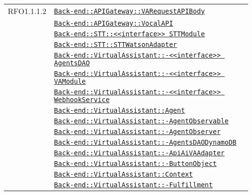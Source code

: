 \begin{longtable}{|>{\centering}m{3cm}|m{10cm}<{\centering}|}
RFO1.1.1.2 & \hyperref[Back-end::APIGateway::VARequestAPIBody]{\texttt{Back-end::APIGateway::VARequestAPIBody}}\\
& \hyperref[Back-end::APIGateway::VocalAPI]{\texttt{Back-end::APIGateway::VocalAPI}}\\
& \hyperref[Back-end::STT::<<interface>> STTModule]{\texttt{Back-end::STT::<<interface>> STTModule}}\\
& \hyperref[Back-end::STT::STTWatsonAdapter]{\texttt{Back-end::STT::STTWatsonAdapter}}\\
& \hyperref[Back-end::VirtualAssistant::<<interface>> AgentsDAO]{\texttt{Back-end::VirtualAssistant::-\linebreak <<interface>> AgentsDAO}}\\
& \hyperref[Back-end::VirtualAssistant::<<interface>> VAModule]{\texttt{Back-end::VirtualAssistant::-\linebreak <<interface>> VAModule}}\\
& \hyperref[Back-end::VirtualAssistant::<<interface>> WebhookService]{\texttt{Back-end::VirtualAssistant::-\linebreak <<interface>> WebhookService}}\\
& \hyperref[Back-end::VirtualAssistant::Agent]{\texttt{Back-end::VirtualAssistant::Agent}}\\
& \hyperref[Back-end::VirtualAssistant::AgentObservable]{\texttt{Back-end::VirtualAssistant::-\linebreak AgentObservable}}\\
& \hyperref[Back-end::VirtualAssistant::AgentObserver]{\texttt{Back-end::VirtualAssistant::-\linebreak AgentObserver}}\\
& \hyperref[Back-end::VirtualAssistant::AgentsDAODynamoDB]{\texttt{Back-end::VirtualAssistant::-\linebreak AgentsDAODynamoDB}}\\
& \hyperref[Back-end::VirtualAssistant::ApiAiVAAdapter]{\texttt{Back-end::VirtualAssistant::-\linebreak ApiAiVAAdapter}}\\
& \hyperref[Back-end::VirtualAssistant::ButtonObject]{\texttt{Back-end::VirtualAssistant::-\linebreak ButtonObject}}\\
& \hyperref[Back-end::VirtualAssistant::Context]{\texttt{Back-end::VirtualAssistant::Context}}\\
& \hyperref[Back-end::VirtualAssistant::Fulfillment]{\texttt{Back-end::VirtualAssistant::-\linebreak Fulfillment}}\\

\end{longtable}
